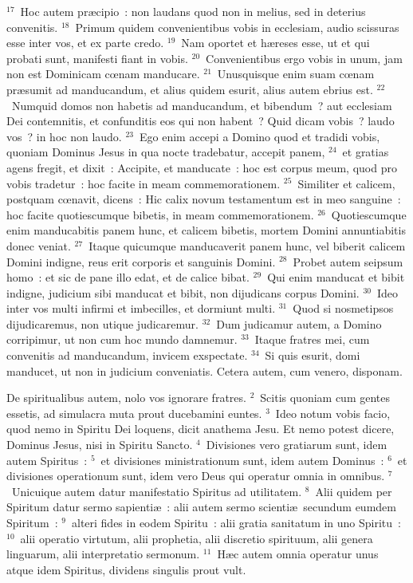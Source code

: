 ${}^{17}$~Hoc autem pr\ae cipio~: non laudans quod non in melius, sed in deterius convenitis.
${}^{18}$~Primum quidem convenientibus vobis in ecclesiam, audio scissuras esse inter vos, et ex parte credo.
${}^{19}$~Nam oportet et h\ae reses esse, ut et qui probati sunt, manifesti fiant in vobis.
${}^{20}$~Convenientibus ergo vobis in unum, jam non est Dominicam cœnam manducare.
${}^{21}$~Unusquisque enim suam cœnam pr\ae sumit ad manducandum, et alius quidem esurit, alius autem ebrius est.
${}^{22}$~Numquid domos non habetis ad manducandum, et bibendum~? aut ecclesiam Dei contemnitis, et confunditis eos qui non habent~? Quid dicam vobis~? laudo vos~? in hoc non laudo.
${}^{23}$~Ego enim accepi a Domino quod et tradidi vobis, quoniam Dominus Jesus in qua nocte tradebatur, accepit panem,
${}^{24}$~et gratias agens fregit, et dixit~: Accipite, et manducate~: hoc est corpus meum, quod pro vobis tradetur~: hoc facite in meam commemorationem.
${}^{25}$~Similiter et calicem, postquam cœnavit, dicens~: Hic calix novum testamentum est in meo sanguine~: hoc facite quotiescumque bibetis, in meam commemorationem.
${}^{26}$~Quotiescumque enim manducabitis panem hunc, et calicem bibetis, mortem Domini annuntiabitis donec veniat.
${}^{27}$~Itaque quicumque manducaverit panem hunc, vel biberit calicem Domini indigne, reus erit corporis et sanguinis Domini.
${}^{28}$~Probet autem seipsum homo~: et sic de pane illo edat, et de calice bibat.
${}^{29}$~Qui enim manducat et bibit indigne, judicium sibi manducat et bibit, non dijudicans corpus Domini.
${}^{30}$~Ideo inter vos multi infirmi et imbecilles, et dormiunt multi.
${}^{31}$~Quod si nosmetipsos dijudicaremus, non utique judicaremur.
${}^{32}$~Dum judicamur autem, a Domino corripimur, ut non cum hoc mundo damnemur.
${}^{33}$~Itaque fratres mei, cum convenitis ad manducandum, invicem exspectate.
${}^{34}$~Si quis esurit, domi manducet, ut non in judicium conveniatis. Cetera autem, cum venero, disponam.

\lettrine[lines=10,image=true,loversize=0.05,lraise=-0.03]{D}{}e spiritualibus autem, nolo vos ignorare fratres.
${}^{2}$~Scitis quoniam cum gentes essetis, ad simulacra muta prout ducebamini euntes.
${}^{3}$~Ideo notum vobis facio, quod nemo in Spiritu Dei loquens, dicit anathema Jesu. Et nemo potest dicere, Dominus Jesus, nisi in Spiritu Sancto.
${}^{4}$~Divisiones vero gratiarum sunt, idem autem Spiritus~:
${}^{5}$~et divisiones ministrationum sunt, idem autem Dominus~:
${}^{6}$~et divisiones operationum sunt, idem vero Deus qui operatur omnia in omnibus.
${}^{7}$~Unicuique autem datur manifestatio Spiritus ad utilitatem.
${}^{8}$~Alii quidem per Spiritum datur sermo sapienti\ae~: alii autem sermo scienti\ae\ secundum eumdem Spiritum~:
${}^{9}$~alteri fides in eodem Spiritu~: alii gratia sanitatum in uno Spiritu~:
${}^{10}$~alii operatio virtutum, alii prophetia, alii discretio spirituum, alii genera linguarum, alii interpretatio sermonum.
${}^{11}$~H\ae c autem omnia operatur unus atque idem Spiritus, dividens singulis prout vult.


